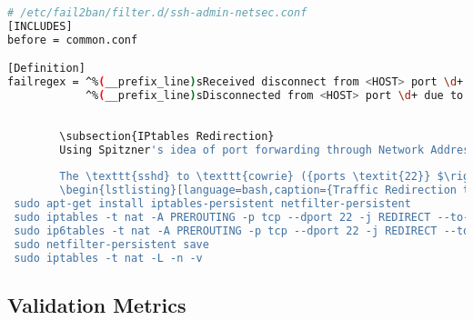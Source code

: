 \documentclass{cls/ULBreport}
\begin{document}
        \begin{lstlisting}[language=bash,caption={Regex Filter Against Key-Based Attacks}]
 # /etc/fail2ban/filter.d/ssh-admin-netsec.conf
[INCLUDES]
before = common.conf

[Definition]
failregex = ^%(__prefix_line)sReceived disconnect from <HOST> port \d+: Too many authentication failures
            ^%(__prefix_line)sDisconnected from <HOST> port \d+ due to: Authentication failed for .* publickey\end{lstlisting}
        
        
        \subsection{IPtables Redirection}
        Using Spitzner's idea of port forwarding through Network Address Translation (NAT) (Ch.12), all traffic to the standard SSH port (22) is re-routed to the Cowrie honeypot on port 2222. This helps separate the malicious activity from the legitimate usage taking place on port 61001, and helps support Spitzner's idea of compartmentalization to separate the honeypot from the production systems and avoid any conflicts (Ch.12). Additionally, our group collaborators' IP addresses could be whitelisted for a much tighter defense. 
        
        The \texttt{sshd} to \texttt{cowrie} ({ports \textit{22}} $\rightarrow$ \textit{2222}) redirection is a security design with multiple benefits: both processes avoid conflicting with each other as they can restart separately, binding to high ports does not require root privileges, also, \texttt{fail2ban} needs an explicit target to be effective. Compartmentalization is a key principle for any deceptive operation, we also ensure an appropriate foundation for clean and comprehensive post-attack analysis.
        \begin{lstlisting}[language=bash,caption={Traffic Redirection to Cowrie}]
 sudo apt-get install iptables-persistent netfilter-persistent
 sudo iptables -t nat -A PREROUTING -p tcp --dport 22 -j REDIRECT --to-port 2222
 sudo ip6tables -t nat -A PREROUTING -p tcp --dport 22 -j REDIRECT --to-port 2222
 sudo netfilter-persistent save
 sudo iptables -t nat -L -n -v\end{lstlisting}
        

        
        \subsection{Validation Metrics}  
        \label{sec:validation}  
        
\end{document}
